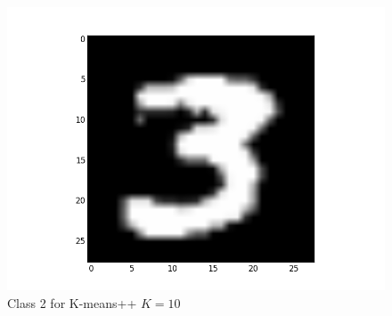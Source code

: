 \documentclass[submit]{harvardml}
\begin{document}
\begin{figure}[ht]
    \includegraphics[scale=0.20]{K10-representative-1-2}
    \caption{Class 2 for K-means++ $K=10$}
\end{figure}
\end{document}
